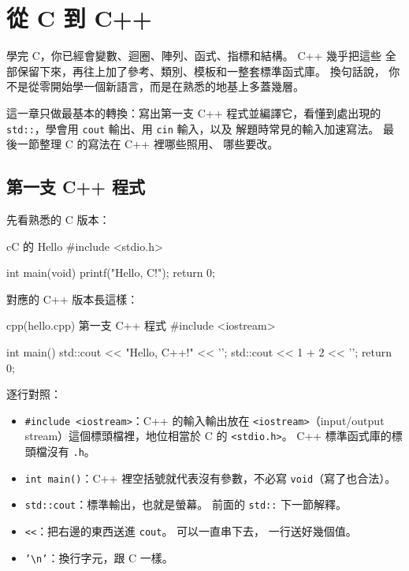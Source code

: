 \chapter{從 C 到 C++}
\label{ch:from-c-to-cpp}

學完 C，你已經會變數、迴圈、陣列、函式、指標和結構。 C++ 幾乎把這些
全部保留下來，再往上加了參考、類別、模板和一整套標準函式庫。 換句話說，
你不是從零開始學一個新語言，而是在熟悉的地基上多蓋幾層。

這一章只做最基本的轉換：寫出第一支 C++ 程式並編譯它，看懂到處出現的
\texttt{std::}，學會用 \texttt{cout} 輸出、用 \texttt{cin} 輸入，以及
解題時常見的輸入加速寫法。 最後一節整理 C 的寫法在 C++ 裡哪些照用、
哪些要改。

\section{第一支 C++ 程式}
\label{sec:first-program}

先看熟悉的 C 版本：

\begin{code}{c}{C 的 Hello}
#include <stdio.h>

int main(void) {
    printf("Hello, C!\n");
    return 0;
}
\end{code}

對應的 C++ 版本長這樣：

\begin{example}[label=ex:hello]{cpp}{(hello.cpp) 第一支 C++ 程式}
#include <iostream>

int main() {
    std::cout << "Hello, C++!" << '\n';
    std::cout << 1 + 2 << '\n';
    return 0;
}
\end{example}


逐行對照：

\begin{itemize}
\item \texttt{\#include <iostream>}：C++ 的輸入輸出放在
\texttt{<iostream>}（input/output stream）這個標頭檔裡，地位相當於
C 的 \texttt{<stdio.h>}。 C++ 標準函式庫的標頭檔沒有 \texttt{.h}。
\item \texttt{int main()}：C++ 裡空括號就代表沒有參數，不必寫
\texttt{void}（寫了也合法）。
\item \texttt{std::cout}：標準輸出，也就是螢幕。 前面的 \texttt{std::}
下一節解釋。
\item \texttt{<<}：把右邊的東西送進 \texttt{cout}。 可以一直串下去，
一行送好幾個值。
\item \texttt{'\textbackslash n'}：換行字元，跟 C 一樣。
\end{itemize}

